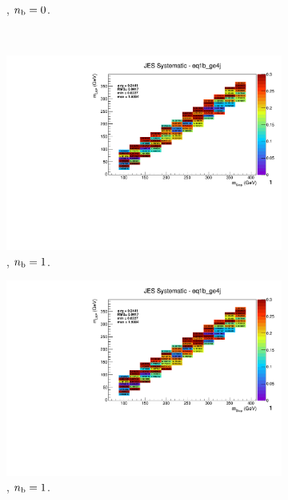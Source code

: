 \begin{figure}[ht!]
\begin{subfigure}[b]{0.32\textwidth}
    \caption{\njhigh, $n_{\text{b}} = 0$.}
    \label{fig:sms-jes-tdegen-ge4j-0b}
  \end{subfigure}\\
  \begin{subfigure}[b]{0.32\textwidth}
    \includegraphics[width=\textwidth, page=12]{Figs/sms/t2degen/v19/systs_v2/T2_4body_JES_eq1b_ge4j.pdf}
    \caption{\njhigh, $n_{\text{b}} = 1$.}
  \end{subfigure}
  \begin{subfigure}[b]{0.32\textwidth}
    \includegraphics[width=\textwidth, page=8]{Figs/sms/t2degen/v19/systs_v2/T2_4body_JES_eq1b_ge4j.pdf}
    \caption{\njhigh, $n_{\text{b}} = 1$.}
  \end{subfigure}
  \begin{subfigure}[b]{0.32\textwidth}

\end{subfigure}
\end{figure}
